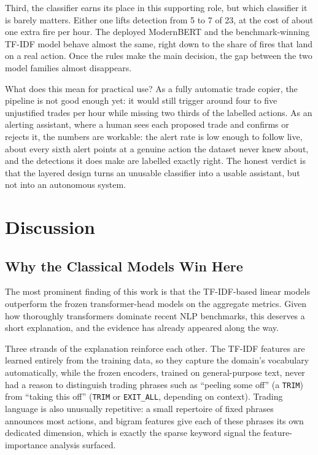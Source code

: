 Third, the classifier earns its place in this supporting role, but which classifier it is barely matters. Either one lifts detection from 5 to 7 of 23, at the cost of about one extra fire per hour. The deployed ModernBERT and the benchmark-winning TF-IDF model behave almost the same, right down to the share of fires that land on a real action. Once the rules make the main decision, the gap between the two model families almost disappears.

What does this mean for practical use? As a fully automatic trade copier, the pipeline is not good enough yet: it would still trigger around four to five unjustified trades per hour while missing two thirds of the labelled actions. As an alerting assistant, where a human sees each proposed trade and confirms or rejects it, the numbers are workable: the alert rate is low enough to follow live, about every sixth alert points at a genuine action the dataset never knew about, and the detections it does make are labelled exactly right. The honest verdict is that the layered design turns an unusable classifier into a usable assistant, but not into an autonomous system.

\section{Discussion}
\label{sec:discussion}

\subsection{Why the Classical Models Win Here}
\label{sec:discussion_classical}

The most prominent finding of this work is that the TF-IDF-based linear models outperform the frozen transformer-head models on the aggregate metrics. Given how thoroughly transformers dominate recent NLP benchmarks, this deserves a short explanation, and the evidence has already appeared along the way.

Three strands of the explanation reinforce each other. The TF-IDF features are learned entirely from the training data, so they capture the domain's vocabulary automatically, while the frozen encoders, trained on general-purpose text, never had a reason to distinguish trading phrases such as ``peeling some off'' (a \texttt{TRIM}) from ``taking this off'' (\texttt{TRIM} or \texttt{EXIT\_ALL}, depending on context). Trading language is also unusually repetitive: a small repertoire of fixed phrases announces most actions, and bigram features give each of these phrases its own dedicated dimension, which is exactly the sparse keyword signal the feature-importance analysis surfaced.

